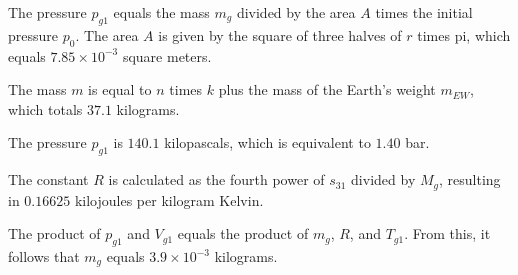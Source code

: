 The pressure \( p_{g1} \) equals the mass \( m_g \) divided by the area \( A \) times the initial pressure \( p_0 \). The area \( A \) is given by the square of three halves of \( r \) times pi, which equals \( 7.85 \times 10^{-3} \) square meters.

The mass \( m \) is equal to \( n \) times \( k \) plus the mass of the Earth's weight \( m_{EW} \), which totals \( 37.1 \) kilograms.

The pressure \( p_{g1} \) is \( 140.1 \) kilopascals, which is equivalent to \( 1.40 \) bar.

The constant \( R \) is calculated as the fourth power of \( s_{31} \) divided by \( M_g \), resulting in \( 0.16625 \) kilojoules per kilogram Kelvin.

The product of \( p_{g1} \) and \( V_{g1} \) equals the product of \( m_g \), \( R \), and \( T_{g1} \). From this, it follows that \( m_g \) equals \( 3.9 \times 10^{-3} \) kilograms.